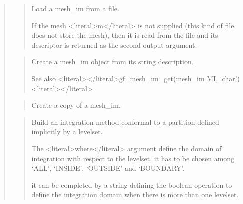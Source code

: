 \documentclass[a4paper,11pt,english]{sphinxmanual}
\begin{document}
\sphinxAtStartPar
{}
\begin{quote}

\sphinxAtStartPar
{}
\begin{quote}

\sphinxAtStartPar
Load a mesh\_im from a file.

\sphinxAtStartPar
If the mesh \textless{}literal\textgreater{}m\textless{}/literal\textgreater{} is not supplied (this kind of file does not store the
mesh), then it is read from the file and its descriptor is returned as
the second output argument.
\end{quote}

\sphinxAtStartPar
{}
\begin{quote}

\sphinxAtStartPar
Create a mesh\_im object from its string description.

\sphinxAtStartPar
See also \textless{}literal\textgreater{}\textless{}/literal\textgreater{}gf\_mesh\_im\_get(mesh\_im MI, ‘char’)\textless{}literal\textgreater{}\textless{}/literal\textgreater{}
\end{quote}

\sphinxAtStartPar
{}
\begin{quote}

\sphinxAtStartPar
Create a copy of a mesh\_im.
\end{quote}

\sphinxAtStartPar
{}
\begin{quote}

\sphinxAtStartPar
Build an integration method conformal to a partition defined
implicitly by a levelset.

\sphinxAtStartPar
The \textless{}literal\textgreater{}where\textless{}/literal\textgreater{} argument define the domain of integration with respect to
the levelset, it has to be chosen among ‘ALL’, ‘INSIDE’, ‘OUTSIDE’ and
‘BOUNDARY’.

\sphinxAtStartPar
it can be completed by a string defining the boolean operation
to define the integration domain when there is more than one levelset.


\end{quote}
\end{quote}
\end{document}
